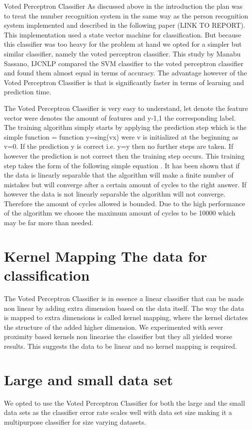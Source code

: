 \documentclass[%
        compressed,
        final,
        notitlepage,
        narroweqnarray,
        inline,
        twoside,
        ]{ieee}
\begin{document}
Voted Perceptron Classifier
As discussed above in the introduction the plan was to treat the number recognition system in the same way as the person recognition system implemented and described in the following paper  (LINK TO REPORT). This implementation used a state vector machine for classification. But because this classifier was too heavy for the problem at hand we opted for a simpler but similar classifier, namely the voted perceptron classifier. This study by Manabu Sassano, IJCNLP compared the SVM classifier to the voted perceptron classifier and found them almost equal in terms of accuracy. The advantage however of the Voted Perceptron Classifier is that is significantly faster in terms of learning and prediction time.

The Voted Perceptron Classifier is very easy to understand, let  denote the feature vector were   denotes the amount of features and y{-1,1} the corresponding label. The training algorithm simply starts by applying the prediction step which is the simple function = function y=sing(vx) were v is initialized at the beginning as v=0. If the prediction y is correct i.e. y=y then no further steps are taken. If however the prediction is not correct then the training step occurs. This training step takes the form of the following simple equation . It has been shown that if the data is linearly separable that the algorithm will make a finite number of mistakes but will converge after a certain amount of cycles to the right answer. If however the data is not linearly separable the algorithm will not converge. Therefore the amount of cycles allowed is bounded. Due to the high performance of the algorithm we choose the maximum amount of cycles to be 10000 which may be far more than needed.

\section{Kernel Mapping The data for classification}
The Voted Perceptron Classifier is in essence a linear classifier that can be made non linear by adding extra dimension based on the data itself. The way the data is mapped to extra dimensions is called kernel mapping, where the kernel dictates the structure of the added higher dimension. We experimented with sever proximity based kernels non linearise the classifier but they all yielded worse results. This suggests the data to be linear and no kernel mapping is required.

\section{Large and small data set}
We opted to use the Voted Perceptron Classifier for both the large and the small data sets as the classifier error rate scales well with data set size making it a multipurpose classifier for size varying datasets.
\end{document}
